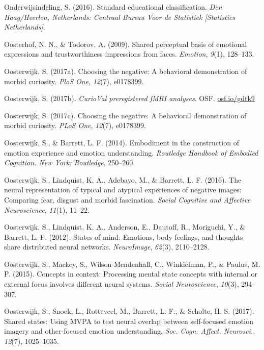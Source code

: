 \documentclass[11pt,american,a4paper,oneside,]{memoir} %
\begin{document}
\leavevmode\hypertarget{ref-Onderwijsindeling2016-tb}{}%
Onderwijsindeling, S. (2016). Standard educational classification. \emph{Den Haag/Heerlen, Netherlands: Centraal Bureau Voor de Statistiek {[}Statistics Netherlands{]}}.

\leavevmode\hypertarget{ref-Oosterhof2009-mf}{}%
Oosterhof, N. N., \& Todorov, A. (2009). Shared perceptual basis of emotional expressions and trustworthiness impressions from faces. \emph{Emotion}, \emph{9}(1), 128--133.

\leavevmode\hypertarget{ref-oosterwijk2017choosing}{}%
Oosterwijk, S. (2017a). Choosing the negative: A behavioral demonstration of morbid curiosity. \emph{PloS One}, \emph{12}(7), e0178399.

\leavevmode\hypertarget{ref-oosterwijk2017prereg}{}%
Oosterwijk, S. (2017b). \emph{CurioVal preregistered fMRI analyses}. OSF. \url{osf.io/gdtk9}

\leavevmode\hypertarget{ref-Oosterwijk2017-dw}{}%
Oosterwijk, S. (2017c). Choosing the negative: A behavioral demonstration of morbid curiosity. \emph{PLoS One}, \emph{12}(7), e0178399.

\leavevmode\hypertarget{ref-oosterwijk2014embodiment}{}%
Oosterwijk, S., \& Barrett, L. F. (2014). Embodiment in the construction of emotion experience and emotion understanding. \emph{Routledge Handbook of Embodied Cognition. New York: Routledge}, 250--260.

\leavevmode\hypertarget{ref-oosterwijk2016neural}{}%
Oosterwijk, S., Lindquist, K. A., Adebayo, M., \& Barrett, L. F. (2016). The neural representation of typical and atypical experiences of negative images: Comparing fear, disgust and morbid fascination. \emph{Social Cognitive and Affective Neuroscience}, \emph{11}(1), 11--22.

\leavevmode\hypertarget{ref-oosterwijk2012states}{}%
Oosterwijk, S., Lindquist, K. A., Anderson, E., Dautoff, R., Moriguchi, Y., \& Barrett, L. F. (2012). States of mind: Emotions, body feelings, and thoughts share distributed neural networks. \emph{NeuroImage}, \emph{62}(3), 2110--2128.

\leavevmode\hypertarget{ref-oosterwijk2015concepts}{}%
Oosterwijk, S., Mackey, S., Wilson-Mendenhall, C., Winkielman, P., \& Paulus, M. P. (2015). Concepts in context: Processing mental state concepts with internal or external focus involves different neural systems. \emph{Social Neuroscience}, \emph{10}(3), 294--307.

\leavevmode\hypertarget{ref-Oosterwijk2017-sc}{}%
Oosterwijk, S., Snoek, L., Rotteveel, M., Barrett, L. F., \& Scholte, H. S. (2017). Shared states: Using MVPA to test neural overlap between self-focused emotion imagery and other-focused emotion understanding. \emph{Soc. Cogn. Affect. Neurosci.}, \emph{12}(7), 1025--1035.
\end{document}
